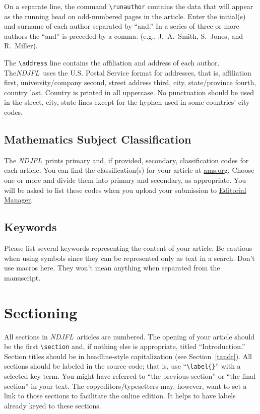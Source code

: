 \documentclass{ndjflart}
\theoremstyle{definition}
\theoremstyle{remark}
\newcommand{\NDJFL}{\emph{NDJFL}}
\begin{document}
On a separate line, the command \verb=\runauthor= contains the data
that will appear as the running head on odd-numbered pages in the
article.  Enter the initial(s) and surname of each author separated by
``and.''  In a series of three or more authors the ``and'' is preceded
by a comma. (e.g., J.~A.~Smith, S.~Jones, and R.~Miller).

The \verb=\address= line contains the affiliation and address of each
author.  The\linebreak \NDJFL\ uses the U.S. Postal Service format for
addresses, that is, affiliation first, university/company second,
street address third, city, state/province fourth, country last.
Country is printed in all uppercase. No punctuation should be used in
the street, city, state lines except for the hyphen used in some
countries' city codes.

\subsection{Mathematics Subject Classification}\label{msc} 
The \NDJFL\ prints primary and, if provided, secondary, classification
codes for each article.  You can find the classification(s) for your
article at
\href{http://www.ams.org/mathscinet/freeTools.html}{ams.org}.  Choose
one or more and divide them into primary and secondary, as
appropriate.  You will be asked to list these codes when you upload
your submission to
\href{http://www.editorialmanager.com/ndjfl}{Editorial Manager}.

\subsection{Keywords}\label{kwd} Please list several keywords
representing the content of your article.  Be cautious when using
symbols since they can be represented only as text in a search.  Don't
use macros here. They won't mean anything when separated from the
manuscript.


\section{Sectioning}\label{secs} All sections in \NDJFL\ articles are
numbered.  The opening of your article should be the first
\verb=\section= and, if nothing else is appropriate, titled
``Introduction.''  Section titles should be in headline-style capitalization (see Section~\ref{tandr}).  All sections should be labeled in the source code;
that is, use ``\verb=\label{}='' with a selected key term.  You might
have referred to ``the previous section'' or ``the final section'' in
your text.  The copyeditors/typesetters may, however, want to set a
link to those sections to facilitate the online edition.  It helps to
have labels already keyed to these sections.
\end{document}

